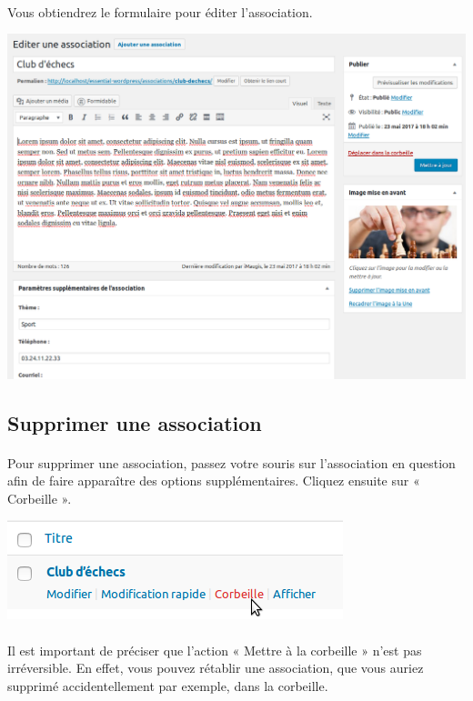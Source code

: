 \documentclass[10pt,a4paper]{article}
\begin{document}
\paragraph{}Vous obtiendrez le formulaire pour éditer l'association.
\begin{center}
\includegraphics[scale=0.2]{img/0304.png}
\end{center}
\newpage
\subsection{Supprimer une association}
\paragraph{}Pour supprimer une association, passez votre souris sur l’association en question afin de faire apparaître des options supplémentaires. Cliquez ensuite sur « Corbeille ».
\begin{center}
\includegraphics[scale=0.3]{img/0305.png}
\end{center}
\paragraph{}Il est important de préciser que l’action « Mettre à la corbeille » n’est pas irréversible. En effet, vous pouvez rétablir une association, que vous auriez supprimé accidentellement par exemple, dans la corbeille.
\end{document}
